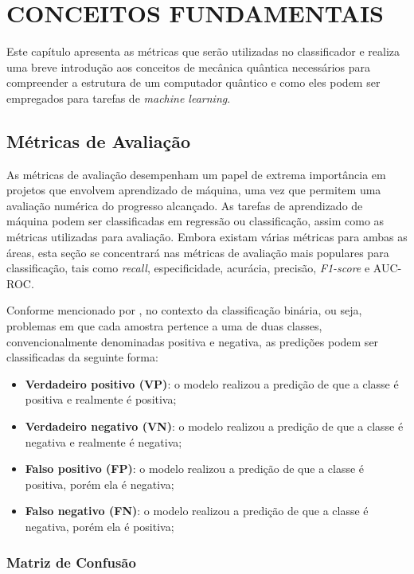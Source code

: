 \chapter{CONCEITOS FUNDAMENTAIS}\label{chap:conceitos}

Este capítulo apresenta as métricas que serão utilizadas no classificador e realiza uma breve introdução aos conceitos de mecânica quântica necessários para compreender a estrutura de um computador quântico e como eles podem ser empregados para tarefas de \textit{machine learning}.

\section{Métricas de Avaliação}

As métricas de avaliação desempenham um papel de extrema importância em projetos que envolvem aprendizado de máquina, uma vez que permitem uma avaliação numérica do progresso alcançado. As tarefas de aprendizado de máquina podem ser classificadas em regressão ou classificação, assim como as métricas utilizadas para avaliação. Embora existam várias métricas para ambas as áreas, esta seção se concentrará nas métricas de avaliação mais populares para classificação, tais como \textit{recall}, especificidade, acurácia, precisão, \textit{F1-score} e AUC-ROC.

Conforme mencionado por , no contexto da classificação binária, ou seja, problemas em que cada amostra pertence a uma de duas classes, convencionalmente denominadas positiva e negativa, as predições podem ser classificadas da seguinte forma:

\begin{itemize}
\item \textbf{Verdadeiro positivo (VP)}: o modelo realizou a predição de que a classe é positiva e realmente é positiva;
\item \textbf{Verdadeiro negativo (VN)}: o modelo realizou a predição de que a classe é negativa e realmente é negativa;
\item \textbf{Falso positivo (FP)}: o modelo realizou a predição de que a classe é positiva, porém ela é negativa;
\item \textbf{Falso negativo (FN)}: o modelo realizou a predição de que a classe é negativa, porém ela é positiva;
\end{itemize}

\subsection{Matriz de Confusão}

